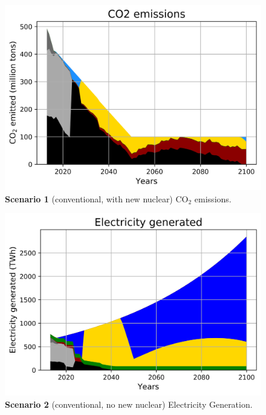 \documentclass[final]{beamer}
\newlength{\onecolwid}
\newlength{\twocolwid}
\newlength{\threecolwid}
\begin{document}
\begin{frame}[t]
\begin{columns}[t,totalwidth=\threecolwid]
\begin{column}{\twocolwid}
\begin{columns}[t,totalwidth=\twocolwid]
\begin{column}{\onecolwid}
\begin{figure}[H] 
\centering
\includegraphics[scale=1.51]{conv_nuc_co2}
\caption{\textbf{Scenario 1} (conventional, with new nuclear) CO$_2$ emissions.}
\label{s1c}
\end{figure}


\begin{figure}[H] 
\centering
\includegraphics[scale=1.51]{conv_nonuc_elc}
\caption{\textbf{Scenario 2} (conventional, no new nuclear) Electricity Generation.}
\label{s2e}
\end{figure}


\end{column}
\end{columns}
\end{column}
\end{columns}
\end{frame}
\end{document}
